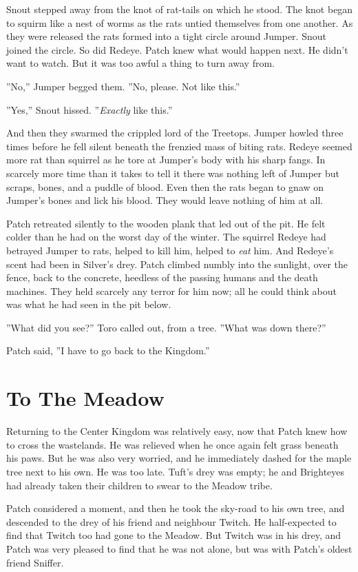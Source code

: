 \documentclass[12pt]{book}
\begin{document}
Snout stepped away from the knot of rat-tails on which he stood. The
knot began to squirm like a nest of worms as the rats untied
themselves from one another. As they were released the rats formed
into a tight circle around Jumper. Snout joined the circle. So did
Redeye. Patch knew what would happen next. He didn't want to
watch. But it was too awful a thing to turn away from.

''No,'' Jumper begged them. ''No, please. Not like this.''

''Yes,'' Snout hissed. ''\textit{Exactly} like this.''

And then they swarmed the crippled lord of the Treetops. Jumper howled
three times before he fell silent beneath the frenzied mass of biting
rats. Redeye seemed more rat than squirrel as he tore at Jumper's body
with his sharp fangs. In scarcely more time than it takes to tell it
there was nothing left of Jumper but scraps, bones, and a puddle of
blood. Even then the rats began to gnaw on Jumper's bones and lick his
blood. They would leave nothing of him at all.

Patch retreated silently to the wooden plank that led out of the
pit. He felt colder than he had on the worst day of the winter. The
squirrel Redeye had betrayed Jumper to rats, helped to kill him,
helped to \textit{eat} him. And Redeye's scent had been in Silver's
drey. Patch climbed numbly into the sunlight, over the fence, back to
the concrete, heedless of the passing humans and the death
machines. They held scarcely any terror for him now; all he could
think about was what he had seen in the pit below.

''What did you see?'' Toro called out, from a tree. ''What was down
there?''

Patch said, ''I have to go back to the Kingdom.''


\section{To The Meadow}

Returning to the Center Kingdom was relatively easy, now that Patch
knew how to cross the wastelands. He was relieved when he once again
felt grass beneath his paws. But he was also very worried, and he
immediately dashed for the maple tree next to his own. He was too
late. Tuft's drey was empty; he and Brighteyes had already taken their
children to swear to the Meadow tribe.

Patch considered a moment, and then he took the sky-road to his own
tree, and descended to the drey of his friend and neighbour Twitch. He
half-expected to find that Twitch too had gone to the Meadow. But
Twitch was in his drey, and Patch was very pleased to find that he was
not alone, but was with Patch's oldest friend Sniffer.
\end{document}
